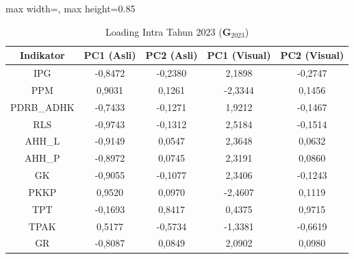 \begin{table}[H]
\centering
\caption{Loading Intra Tahun 2023 ($\mathbf{G}_{2023}$)} \label{tab:app2loading_intra_2023}
\begin{adjustbox}{max width=\textwidth, max height=0.85\textheight}
\begin{tabular}{|c|c|c|c|c|}
\hline
\textbf{Indikator} & \textbf{PC1 (Asli)} & \textbf{PC2 (Asli)} & \textbf{PC1 (Visual)} & \textbf{PC2 (Visual)} \\
\hline
IPG & -0,8472 & -0,2380 & 2,1898 & -0,2747 \\
PPM & 0,9031 & 0,1261 & -2,3344 & 0,1456 \\
PDRB\_ADHK & -0,7433 & -0,1271 & 1,9212 & -0,1467 \\
RLS & -0,9743 & -0,1312 & 2,5184 & -0,1514 \\
AHH\_L & -0,9149 & 0,0547 & 2,3648 & 0,0632 \\
AHH\_P & -0,8972 & 0,0745 & 2,3191 & 0,0860 \\
GK & -0,9055 & -0,1077 & 2,3406 & -0,1243 \\
PKKP & 0,9520 & 0,0970 & -2,4607 & 0,1119 \\
TPT & -0,1693 & 0,8417 & 0,4375 & 0,9715 \\
TPAK & 0,5177 & -0,5734 & -1,3381 & -0,6619 \\
GR & -0,8087 & 0,0849 & 2,0902 & 0,0980 \\
\hline
\end{tabular}
\end{adjustbox}
\end{table}